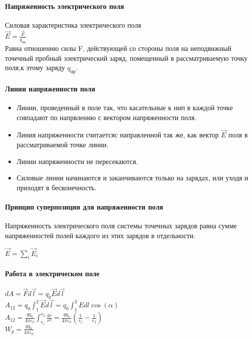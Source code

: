 \documentclass[a4paper]{article}
\begin{document}
\paragraph{Напряженность электрического поля}
Силовая характеристика электрического поля
\\ $\vec{E} = \frac{\vec{F}}{q_{пр}}$ 
\\ Равна отношению силы F, действующей со стороны поля на неподвижный точечный пробный электрический заряд, помещенный в рассматриваемую точку поля,к этому заряду $q_{пр}$.

\paragraph{Линии напряженности поля}
\begin{itemize}
  \item Линии, проведенный в поле так, что касательные к нип в каждой точке совпадают по напрвлению с вектором напряженности поля.
  \item Линия напряженности считаетсяс направленной так же, как вектор $\vec{E}$ поля в рассматриваемой точке линии.
  \item Линии напряженности не пересекаются.
  \item Силовые линии начинаются и заканчиваются только на зарядах, или уходя и приходят в бесконечность.
\end{itemize}
\paragraph{Принцип суперпозиции для напряженности поля}
\begin{itemize}
  Напряженность электрического поля системы точечных зарядов равна сумме напряженностей полей каждого из этих зарядов в отдельности.
\end{itemize}
\begin{center}
  $\vec{E} = \sum_{i} \vec{E}_i$
\end{center}
\paragraph{Работа в электрическом поле}
\begin{itemize}
  $dA = \vec{F}d\vec{l} = q_0\vec{E}d\vec{l}$
\\ $ A_{12} = q_0 \int_{1}^{2} \vec{E}d\vec{l} = q_0 \int_{1}^{2} Edl\cos(\alpha)$\\
$A_{12} = \frac{qq_0}{4\pi \varepsilon_0} \int_{r_i}^{r_2} \frac{dr}{r^2} = \frac{qq_0}{4\pi \varepsilon_0} \left( \frac{1}{r_1} - \frac{1}{r_2} \right) $
\\ $ W_p = \frac{qq_0}{4\pi \varepsilon_0}$ 

\end{itemize}
\end{document}
